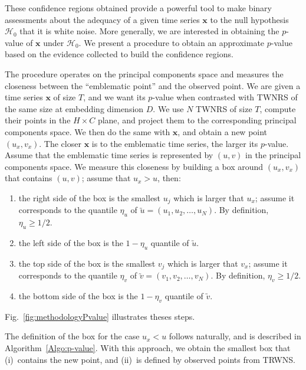 \documentclass[alpha-refs]{wiley-article}
\begin{document}

These confidence regions obtained provide a powerful tool to make binary assessments about the adequacy of a given time series $\bm x$ to the null hypothesis $\mathcal H_0$ that it is white noise.
More generally, we are interested in obtaining the $p$-value of $\bm x$ under $\mathcal H_0$.
We present a procedure to obtain an approximate $p$-value based on the evidence collected to build the confidence regions.

The procedure operates on the principal components space and measures the closeness between the ``emblematic point'' and the observed point.
We are given a time series $\bm x$ of size $T$, and we want its $p$-value when contrasted with TWNRS of the same size at embedding dimension $D$.
We use $N$ TWNRS of size $T$, compute their points in the $H\times C$ plane, and project them to the corresponding principal components space.
We then do the same with $\bm x$, and obtain a new point $(u_x,v_x)$.
The closer $\bm x$ is to the emblematic time series, the larger its $p$-value.
Assume that the emblematic time series is represented by $(u,v)$ in the principal components space.
We measure this closeness by building a box around $(u_x,v_x)$ that contains $(u,v)$; assume that $u_x>u$, then:
\begin{enumerate}
\item the right side of the box is the smallest $u_j$ which is larger that $u_x$; assume it corresponds to the quantile $\eta_u$ of $\utilde u = (u_1,u_2,\dots, u_N)$. By definition, $\eta_u\geq 1/2$.
%
\item the left side of the box is the $1-\eta_u$ quantile of $\utilde u$.
%
\item the top side of the box is the smallest $v_j$ which is larger that $v_x$; assume it corresponds to the quantile $\eta_v$ of $\utilde v = (v_1,v_2,\dots, v_N)$. By definition, $\eta_v\geq 1/2$.
%
\item the bottom side of the box is the $1-\eta_v$ quantile of $\utilde v$.
\end{enumerate}
Fig.~\ref{fig:methodologyPvalue} illustrates theses steps.

The definition of the box for the case $u_x<u$ follows naturally, and is described in Algorithm~\ref{Algo:p-value}.
With this approach, we obtain the smallest box that (i)~contains the new point, and (ii)~is defined by observed points from TRWNS.
\end{document}
